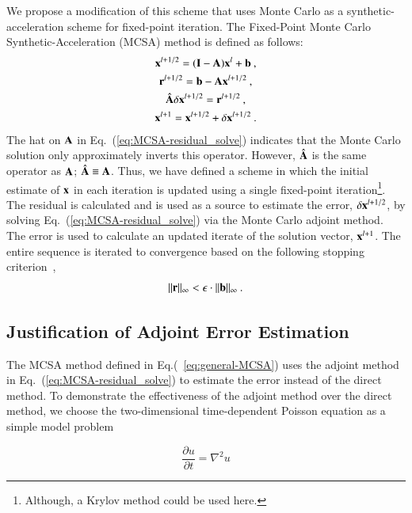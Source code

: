 \documentclass[preprint,12pt]{elsarticle}
\newcommand{\vA}{\ensuremath{\ve{A}}}
\newcommand{\vb}{\ensuremath{\ve{b}}}
\newcommand{\vx}{\ensuremath{\ve{x}}}
\newcommand{\vr}{\ensuremath{\ve{r}}}
\newcommand{\vI}{\ensuremath{\ve{I}}}
\begin{document}
We propose a modification of this scheme that uses Monte Carlo as a
synthetic-acceleration scheme for fixed-point iteration. The
Fixed-Point Monte Carlo Synthetic-Acceleration (MCSA) method is
defined as follows:
\begin{subequations}
  \begin{gather}
    \vx^{l+1/2} = (\vI - \vA)\vx^l + \vb\:, \\
    \vr^{l+1/2} = \vb - \vA\vx^{l+1/2}\:,\\
    \hat{\vA}\delta\vx^{l+1/2} = \vr^{l+1/2}\:,
    \label{eq:MCSA-residual_solve}\\ 
    \vx^{l+1}=\vx^{l+1/2}+\delta\vx^{l+1/2}\:.
  \end{gather}
  \label{eq:general-MCSA}
\end{subequations}
The hat on $\vA$ in Eq.~(\ref{eq:MCSA-residual_solve}) indicates that
the Monte Carlo solution only approximately inverts this operator.
However, $\hat{\vA}$ is the same operator as $\vA$;
$\hat{\vA}\equiv\vA$.  Thus, we have defined a scheme in which the
initial estimate of $\vx$ in each iteration is updated using a single
fixed-point iteration\footnote{Although, a Krylov method could be used
  here.}.  The residual is calculated and is used as a source to
estimate the error, $\delta\vx^{l+1/2}$, by solving
Eq.~(\ref{eq:MCSA-residual_solve}) via the Monte Carlo adjoint method.
The error is used to calculate an updated iterate of the solution
vector, $\vx^{l+1}$.  The entire sequence is iterated to convergence
based on the following stopping criterion~\cite{kelley_1995},
\begin{equation}
  \|\vr\|_{\infty} < \epsilon\cdot\|\vb\|_\infty\:.
  \label{eq:stopping-criteria}
\end{equation}

\subsection{Justification of Adjoint Error Estimation}

The MCSA method defined in Eq.(~\ref{eq:general-MCSA}) uses the
adjoint method in Eq.~(\ref{eq:MCSA-residual_solve}) to estimate the
error instead of the direct method. To demonstrate the effectiveness
of the adjoint method over the direct method, we choose the
two-dimensional time-dependent Poisson equation as a simple model
problem

\begin{equation}
  \frac{\partial u}{\partial t} = \nabla^2 u
  \label{eq:poisson_equation}
\end{equation}
\end{document}
